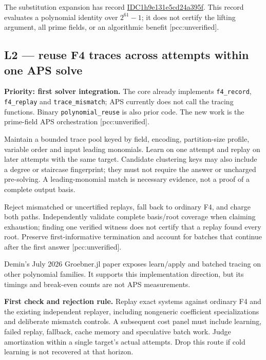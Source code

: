 \documentclass[
  10pt,
]{article}
\begin{document}
The substitution expansion has record
\href{certificates/line-chart.json}{IDC1h9e131e5cd24a395f}. This record
evaluates a polynomial identity over \(2^{61}-1\); it does not certify
the lifting argument, all prime fields, or an algorithmic benefit
{[}pcc:unverified{]}.

\subsection{L2 --- reuse F4 traces across attempts within one APS
solve}\label{l2-reuse-f4-traces-across-attempts-within-one-aps-solve}

\textbf{Priority: first solver integration.} The core already implements
\texttt{f4\_record}, \texttt{f4\_replay} and \texttt{trace\_mismatch};
APS currently does not call the tracing functions. Binary
\texttt{polynomial\_reuse} is also prior code. The new work is the
prime-field APS orchestration {[}pcc:unverified{]}.

Maintain a bounded trace pool keyed by field, encoding, partition-size
profile, variable order and input leading monomials. Learn on one
attempt and replay on later attempts with the same target. Candidate
clustering keys may also include a degree or staircase fingerprint; they
must not require the answer or uncharged pre-solving. A leading-monomial
match is necessary evidence, not a proof of a complete output basis.

Reject mismatched or uncertified replays, fall back to ordinary F4, and
charge both paths. Independently validate complete basis/root coverage
when claiming exhaustion; finding one verified witness does not certify
that a replay found every root. Preserve first-informative termination
and account for batches that continue after the first answer
{[}pcc:unverified{]}.

Demin's July 2026 Groebner.jl paper exposes learn/apply and batched
tracing on other polynomial families. It supports this implementation
direction, but its timings and break-even counts are not APS
measurements.

\textbf{First check and rejection rule.} Replay exact systems against
ordinary F4 and the existing independent replayer, including nongeneric
coefficient specializations and deliberate mismatch controls. A
subsequent cost panel must include learning, failed replay, fallback,
cache memory and speculative batch work. Judge amortization within a
single target's actual attempts. Drop this route if cold learning is not
recovered at that horizon.
\end{document}
